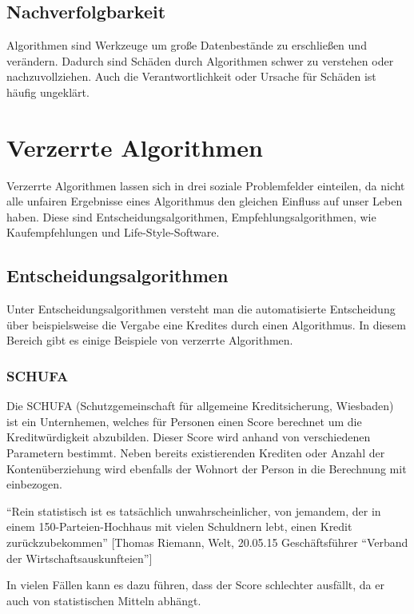 \subsection{Nachverfolgbarkeit}
Algorithmen sind Werkzeuge um große Datenbestände zu erschließen und verändern. Dadurch sind Schäden durch Algorithmen schwer zu verstehen oder nachzuvollziehen. Auch die Verantwortlichkeit oder Ursache für Schäden ist häufig ungeklärt.

\section{Verzerrte Algorithmen}

Verzerrte Algorithmen lassen sich in drei soziale Problemfelder einteilen, da nicht alle unfairen Ergebnisse eines Algorithmus den gleichen Einfluss auf unser Leben haben. 
Diese sind Entscheidungsalgorithmen, Empfehlungsalgorithmen, wie Kaufempfehlungen und Life-Style-Software.


\subsection{Entscheidungsalgorithmen}
Unter Entscheidungsalgorithmen versteht man die automatisierte Entscheidung über beispielsweise die Vergabe eine Kredites durch einen Algorithmus. In diesem Bereich gibt es einige Beispiele von verzerrte Algorithmen. 

\subsubsection{SCHUFA}
Die SCHUFA (Schutzgemeinschaft für allgemeine Kreditsicherung, Wiesbaden) ist ein Unternhemen, welches für Personen einen Score berechnet um die Kreditwürdigkeit abzubilden. Dieser Score wird anhand von verschiedenen Parametern bestimmt. Neben bereits existierenden Krediten oder Anzahl der Kontenüberziehung wird ebenfalls der Wohnort der Person in die Berechnung mit einbezogen. \newline

\enquote{Rein statistisch ist es tatsächlich unwahrscheinlicher, von jemandem, der in einem 150-Parteien-Hochhaus mit vielen Schuldnern lebt, einen Kredit zurückzubekommen}
[Thomas Riemann, Welt, 20.05.15 Geschäftsführer “Verband der Wirtschaftsauskunfteien”]

In vielen Fällen kann es dazu führen, dass der Score schlechter ausfällt, da er auch von statistischen Mitteln abhängt. 


